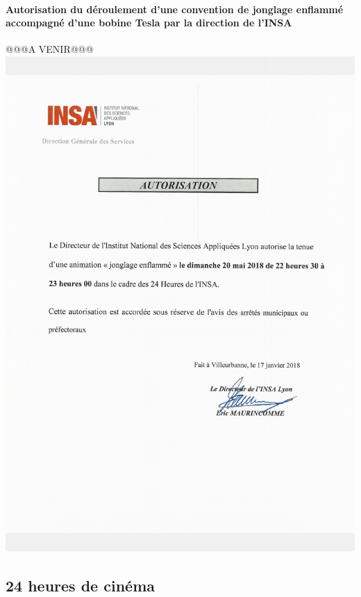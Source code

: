 \documentclass[hidelinks, paper=a4, fontsize=13pt]{report}
\begin{document}
\newpage

\paragraph{Autorisation du déroulement d’une convention de jonglage enflammé accompagné d'une bobine Tesla par la direction de l’INSA}

\begin{center}
@@@A VENIR@@@
\includegraphics[width=.8\textwidth,keepaspectratio]{Annexes/Documents/INSAAutorisationSpectacleDeFeu}
\end{center}

\subsection{24 heures de cinéma}
\end{document}
